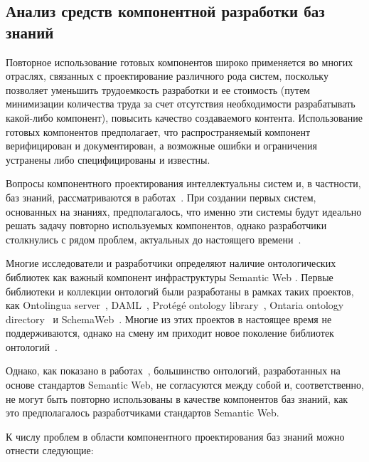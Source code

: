 \subsection[Анализ средств компонентной разработки баз \\знаний]{Анализ средств компонентной разработки баз знаний}

Повторное использование готовых компонентов широко применяется во многих отраслях, связанных с проектирование различного рода систем, поскольку позволяет уменьшить трудоемкость разработки и ее стоимость (путем минимизации количества труда за счет отсутствия необходимости разрабатывать какой-либо компонент), повысить качество создаваемого контента. Использование готовых компонентов предполагает, что распространяемый компонент верифицирован и документирован, а возможные ошибки и ограничения устранены либо специфицированы и известны.

Вопросы компонентного проектирования интеллектуальны систем и, в частности, баз знаний, рассматриваются в работах~\cite{Gribova2015, Borisov2014, Globa2012, Gribova2011, Zarogulko2016}. При создании первых систем, основанных на знаниях, предполагалось, что именно эти системы будут идеально решать задачу повторно используемых компонентов, однако разработчики столкнулись с рядом проблем, актуальных до настоящего времени~\cite{Bolotova2012}. 

Многие исследователи и разработчики определяют наличие онтологических библиотек как важный компонент инфраструктуры Semantic Web \cite{Semantics}. Первые библиотеки и коллекции онтологий были разработаны в рамках таких проектов, как Ontolingua server~\cite{Ontolingua2005}, DAML~\cite{OilEd2013}, Protégé ontology library~\cite{Protege2016}, Ontaria ontology directory~\cite{Ontaria} и SchemaWeb~\cite{SchemaWeb}. Многие из этих проектов в настоящее время не поддерживаются, однако на смену им приходит новое поколение библиотек онтологий~\cite{Aquina2012}. 

Однако, как показано в работах~\cite{Debruyne2009, Leenheer2009}, большинство онтологий, разработанных на основе стандартов Semantic Web, не согласуются между собой и, соответственно, не могут быть повторно использованы в качестве компонентов баз знаний, как это предполагалось разработчиками стандартов Semantic Web.

К числу проблем в области компонентного проектирования баз знаний можно отнести следующие:

